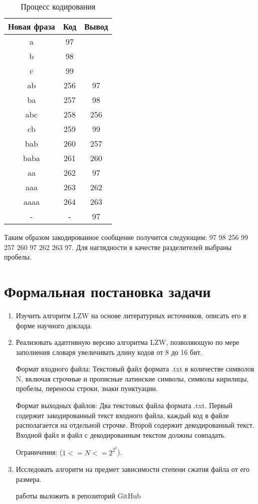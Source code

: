 \documentclass[a4paper]{article}
\begin{document}
\begin{table}[h]
\centering
\begin{tabular}{ |c|c|c| } 
 \hline
 Новая фраза & Код & Вывод \\
 \hline\hline
 a & 97 &  \\
 \hline
 b & 98 &  \\
 \hline
 c & 99 &  \\
 \hline
 ab & 256 & 97 \\
 \hline
 ba & 257 & 98 \\
 \hline
 abc & 258 & 256 \\
 \hline
 cb & 259 & 99 \\
 \hline
 bab & 260 & 257 \\
 \hline
 baba & 261 & 260 \\
 \hline
 aa & 262 & 97 \\
 \hline
 aaa & 263 & 262 \\
 \hline
 aaaa & 264 & 263 \\
 \hline
 - & - & 97 \\
 \hline
\end{tabular}
\caption{\label{tab:widgets}Процесс кодирования}
\end{table}

Таким образом закодированное сообщение получится следующим:
97 98 256 99 257 260 97 262 263 97. Для наглядности в качестве разделителей выбраны пробелы.

\newpage
\section{Формальная постановка задачи}
\begin{enumerate}
\item Изучить алгоритм LZW на основе литературных источников, описать его в форме научного доклада. 

\item Реализовать адаптивную версию алгоритма LZW, позволяющую по мере заполнения словаря увеличивать длину кодов от 8 до 16 бит. 

Формат входного файла:
Текстовый файл формата .txt в количестве символов N, включая строчные и прописные латинские символы, символы кирилицы, пробелы, переносы строки, знаки пунктуации. 

Формат выходных файлов:
Два текстовых файла формата .txt. Первый содержит закодированный текст входного файла, каждый код в файле располагается на отдельной строчке. Второй содержит декодированный текст. Входной файл и файл с декодированным текстом должны совпадать.

Ограничения:
($1<=N<=2^2^0$).

\item Исследовать алгоритм на предмет зависимости степени сжатия файла от его размера.

 работы выложить в репозиторий GitHub
\end{enumerate}
\newpage
\end{document}
